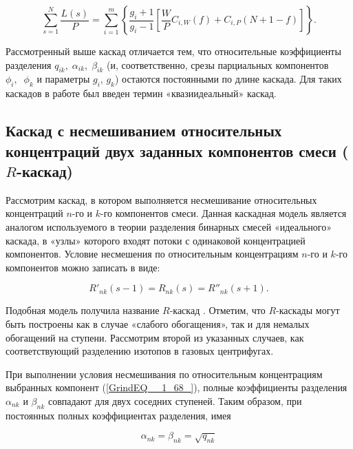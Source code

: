\begin{equation} \label{GrindEQ__1_62_} 
  \sum _{s=1}^{N}\frac{L(s)}{P} =\sum _{i=1}^{m}\left\{\frac{g_{i} +1}{g_{i} -1} \left[\frac{W}{P} C_{i,W} (f)+C_{i,P} \left(N+1-f\right)\right]\right\}  .   
\end{equation} 
  
Рассмотренный выше каскад отличается тем, что относительные коэффициенты разделения $q_{ik} ,\; \alpha _{ik} ,\; \beta _{ik} $ (и, соответственно, срезы парциальных компонентов $\phi _{i} ,\; \; \phi _{k} $ и параметры $g_{i} $, $g_{k} $) остаются постоянными по длине каскада. Для таких каскадов в работе \cite{sazykinKvaziidealnyeKaskadyDlya2000} был введен термин «квазиидеальный» каскад.

\subsection{Каскад с несмешиванием относительных концентраций двух заданных компонентов смеси ($R$-каскад)}\label{R_cas}

Рассмотрим каскад, в котором выполняется несмешивание относительных концентраций $n$-го и $k$-го компонентов смеси. Данная каскадная модель является аналогом используемого в теории разделения бинарных смесей «идеального» каскада, в «узлы» которого входят потоки с одинаковой концентрацией компонентов. Условие несмешения по относительным концентрациям $n$-го и $k$-го компонентов можно записать в виде:

\begin{equation} \label{GrindEQ__1_68_} 
  R'_{nk} (s-1)=R_{nk} (s)=R''_{nk} (s+1).                                                 
\end{equation} 

Подобная модель получила название $R$-каскад \cite{sulaberidzeTeoriyaKaskadovDlya2011}. Отметим, что $R$-каскады могут быть построены как в случае «слабого обогащения», так и для немалых обогащений на ступени. Рассмотрим второй из указанных случаев, как соответствующий разделению изотопов в газовых центрифугах.

При выполнении условия несмешивания по относительным концентрациям выбранных компонент (\ref{GrindEQ__1_68_}), полные коэффициенты разделения $\alpha _{nk}$ и $\beta _{nk}$ совпадают для двух соседних ступеней. Таким образом, при постоянных полных коэффициентах разделения, имея

\begin{equation} \label{GrindEQ__1_69_} 
  \alpha _{nk} =\beta _{nk} =\sqrt{q_{nk} }  
\end{equation} 

